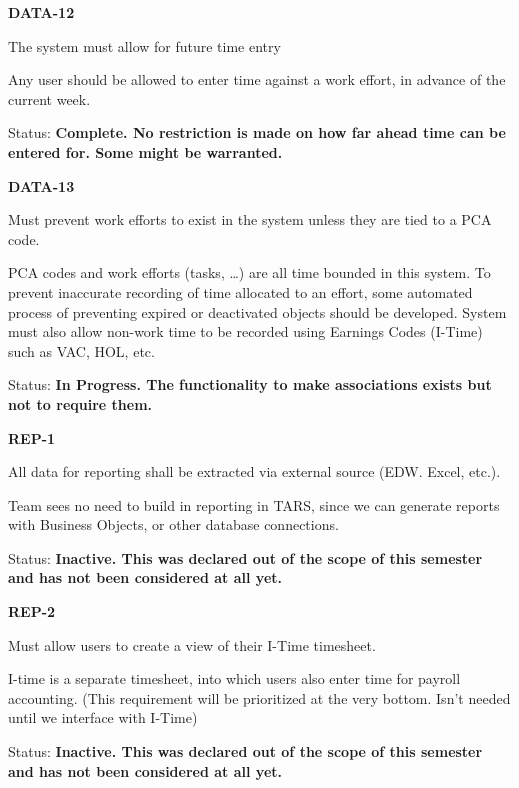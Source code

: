 \documentclass{article}
\begin{document}
\noindent \textit{}


\noindent \textbf{DATA-12}

\noindent The system must allow for future time entry

Any user should be allowed to enter time against a work effort, in advance of the current week.

Status: \textbf{Complete.  No restriction is made on how far ahead time can be entered for.  Some  might be warranted.}

\noindent \textit{}


\noindent \textbf{DATA-13}

\noindent Must prevent work efforts to exist in the system unless they are tied to a PCA code.

\noindent PCA codes and work efforts (tasks, \dots ) are all time bounded in this system. To prevent inaccurate recording of time allocated to an effort, some automated process of preventing expired or deactivated objects should be developed. System must also allow non-work time to be recorded using Earnings Codes (I-Time) such as VAC, HOL, etc.

\noindent Status: \textbf{In Progress.  The functionality to make associations exists but not to require them.}

\noindent \textit{}


\noindent \textbf{REP-1}

\noindent All data for reporting shall be extracted via external source (EDW. Excel, etc.).

\noindent Team sees no need to build in reporting in TARS, since we can generate reports with Business Objects, or other database connections. 

\noindent Status: \textbf{Inactive.   This was declared out of the scope of this semester and has not been considered at all yet.}

\noindent \textit{}


\noindent \textbf{REP-2}

\noindent Must allow users to create a view of their I-Time timesheet.

I-time is a separate timesheet, into which users also enter time for payroll accounting. (This requirement will be prioritized at the very bottom.  Isn't needed until we interface with I-Time)

\noindent Status: \textbf{Inactive.   This was declared out of the scope of this semester and has not been considered at all yet.}

\noindent \textit{}
\end{document}
